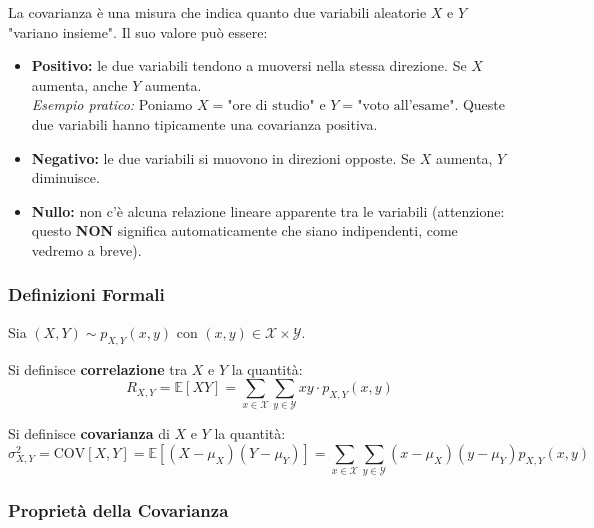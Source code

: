 La covarianza è una misura che indica quanto due variabili aleatorie $X$ e $Y$ "variano insieme". Il suo valore può essere:
\begin{itemize}
    \item \textbf{Positivo:} le due variabili tendono a muoversi nella stessa direzione. Se $X$ aumenta, anche $Y$ aumenta. 
    \\ \textit{Esempio pratico:} Poniamo $X = \text{"ore di studio"}$ e $Y = \text{"voto all'esame"}$. Queste due variabili hanno tipicamente una covarianza positiva.
    \item \textbf{Negativo:} le due variabili si muovono in direzioni opposte. Se $X$ aumenta, $Y$ diminuisce.
    \item \textbf{Nullo:} non c'è alcuna relazione lineare apparente tra le variabili (attenzione: questo \textbf{NON} significa automaticamente che siano indipendenti, come vedremo a breve).
\end{itemize}

\subsubsection{Definizioni Formali}
Sia $(X, Y) \sim p_{X,Y}(x,y)$ con $(x,y) \in \mathcal{X} \times \mathcal{Y}$. 

Si definisce \textbf{correlazione} tra $X$ e $Y$ la quantità:
\begin{equation}
    R_{X,Y} = \mathbb{E}[XY] = \sum_{x \in \mathcal{X}} \sum_{y \in \mathcal{Y}} xy \cdot p_{X,Y}(x, y)
\end{equation}

Si definisce \textbf{covarianza} di $X$ e $Y$ la quantità:
\begin{equation}
    \sigma_{X,Y}^2 = \text{COV}[X, Y] = \mathbb{E}[(X - \mu_X)(Y - \mu_Y)] = \sum_{x \in \mathcal{X}} \sum_{y \in \mathcal{Y}} (x - \mu_X)(y - \mu_Y) p_{X,Y}(x, y)
\end{equation}

\subsubsection{Proprietà della Covarianza}

